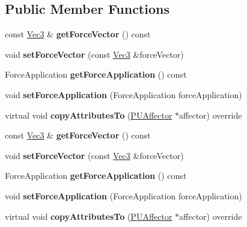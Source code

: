 \subsection*{Public Member Functions}
\begin{DoxyCompactItemize}
\item 
\mbox{\label{classPUBaseForceAffector_a8e07c414d4b020de2c96408738ea1f65}} 
const \hyperlink{classVec3}{Vec3} \& {\bfseries get\+Force\+Vector} () const
\item 
\mbox{\label{classPUBaseForceAffector_a4b555d545ad9e968da8c0c4e1968c1b8}} 
void {\bfseries set\+Force\+Vector} (const \hyperlink{classVec3}{Vec3} \&force\+Vector)
\item 
\mbox{\label{classPUBaseForceAffector_a8a17f6568068a63fd25f503953a7bece}} 
Force\+Application {\bfseries get\+Force\+Application} () const
\item 
\mbox{\label{classPUBaseForceAffector_a1587a85297716f359479db64a8192597}} 
void {\bfseries set\+Force\+Application} (Force\+Application force\+Application)
\item 
\mbox{\label{classPUBaseForceAffector_a2c90363832e6ca25fc041e8ef303e6fc}} 
virtual void {\bfseries copy\+Attributes\+To} (\hyperlink{classPUAffector}{P\+U\+Affector} $\ast$affector) override
\item 
\mbox{\label{classPUBaseForceAffector_a84755899abd14b01fd45847d00e2e939}} 
const \hyperlink{classVec3}{Vec3} \& {\bfseries get\+Force\+Vector} () const
\item 
\mbox{\label{classPUBaseForceAffector_a4b555d545ad9e968da8c0c4e1968c1b8}} 
void {\bfseries set\+Force\+Vector} (const \hyperlink{classVec3}{Vec3} \&force\+Vector)
\item 
\mbox{\label{classPUBaseForceAffector_a7dd624c73c02ab3b1884ad50e3701c94}} 
Force\+Application {\bfseries get\+Force\+Application} () const
\item 
\mbox{\label{classPUBaseForceAffector_a1587a85297716f359479db64a8192597}} 
void {\bfseries set\+Force\+Application} (Force\+Application force\+Application)
\item 
\mbox{\label{classPUBaseForceAffector_a01edfc3982bd955d7e3d39e6e36e21cc}} 
virtual void {\bfseries copy\+Attributes\+To} (\hyperlink{classPUAffector}{P\+U\+Affector} $\ast$affector) override
\end{DoxyCompactItemize}
